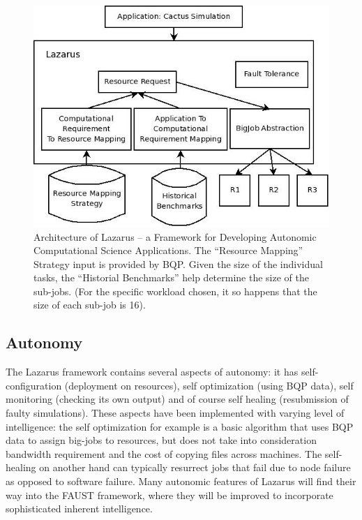 \documentclass{sig-alternate}
\newcommand{\up}{\vspace*{-0.3em}}
\begin{document}
\begin{figure}
\begin{center}
\includegraphics[scale=0.4]{./figures/Lazarus_01.jpeg}
\end{center}
\up\up\up\up\up\up\up\up
\caption{Architecture of Lazarus -- a Framework for Developing
  Autonomic Computational Science Applications. The ``Resource
  Mapping'' Strategy input is provided by BQP. Given the size of the
  individual tasks, the ``Historial Benchmarks'' help determine the
  size of the sub-jobs. (For the specific workload chosen, it so
  happens that the size of each sub-job is 16).}\up\up\up \up\up\up
\label{fig:application_architecture}
\end{figure}


\subsection{Autonomy}
The Lazarus framework contains several aspects of autonomy: it has
self-configuration (deployment on resources), self optimization (using
BQP data), self monitoring (checking its own output) and of course
self healing (resubmission of faulty simulations). These aspects have
been implemented with varying level of intelligence: the self
optimization for example is a basic algorithm that uses BQP data to
assign big-jobs to resources, but does not take into consideration
bandwidth requirement and the cost of copying files across
machines. The self-healing on another hand can typically resurrect
jobs that fail due to node failure as opposed to software
failure. Many autonomic features of Lazarus will find their way into
the FAUST framework, where they will be improved to incorporate
sophisticated inherent intelligence.  
\end{document}
